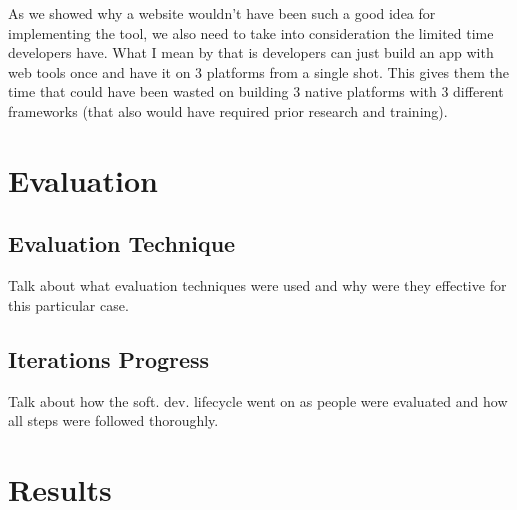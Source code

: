 \documentclass[paper=a4, fontsize=11pt]{scrartcl} %
\numberwithin{equation}{section} %
\numberwithin{figure}{section} %
\numberwithin{table}{section} %
\begin{document}
\par
As we showed why a website wouldn't have been such a good idea for implementing the tool, we also need to take into consideration the limited time developers have. What I mean by that is developers can just build an app with web tools once and have it on 3 platforms from a single shot. This gives them the time that could have been wasted on building 3 native platforms with 3 different frameworks (that also would have required prior research and training).





\section{Evaluation}


\subsection{Evaluation Technique}

\par
Talk about what evaluation techniques were used and why were they effective for this particular case.


\subsection{Iterations Progress}

\par
Talk about how the soft. dev. lifecycle went on as people were evaluated and how all steps were followed thoroughly.



\section{Results}
\end{document}
